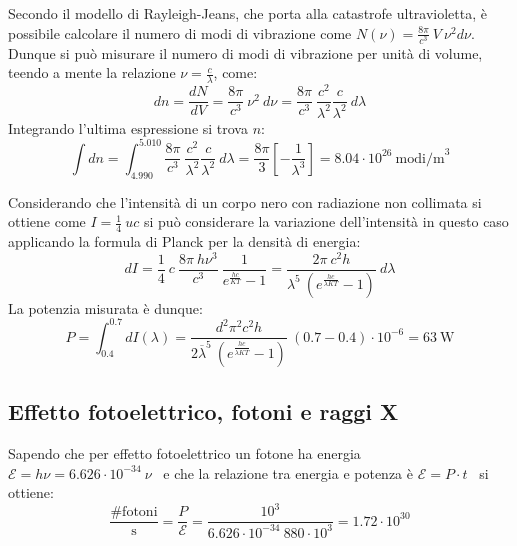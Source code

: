 \documentclass[12pt,twoside,a4]{article}
\begin{document}
\begin{solution}
	 Secondo il modello di Rayleigh-Jeans, che porta alla catastrofe ultravioletta, è possibile calcolare il numero di modi di vibrazione come $N(\nu) = \frac{8\pi}{c^3} \ V \ \nu^2 d\nu$. Dunque si può misurare il numero di modi di vibrazione per unità di volume, teendo a mente la relazione $\nu = \frac{c}{\lambda}$, come: \begin{equation*}
  dn = \frac{dN}{dV} = \frac{8\pi}{c^3} \ \nu^2 \ d\nu =  \frac{8\pi}{c^3} \ \frac{c^2}{\lambda^2} \frac{c}{\lambda^2} \ d\lambda   
 \end{equation*}
 Integrando l'ultima espressione si trova $n$: \begin{equation*}
     \int dn = \int_{4.990}^{5.010} \frac{8\pi}{c^3} \ \frac{c^2}{\lambda^2} \frac{c}{\lambda^2} \ d\lambda = \frac{8\pi}{3} \left[- \frac{1}{\lambda^3}\right] = 8.04 \cdot 10^{26} \ \mathrm{modi/m}^3 
 \end{equation*}
\end{solution}


\newpage
\begin{solution}
	 Considerando che l'intensità di un corpo nero con radiazione non collimata si ottiene come $I = \frac{1}{4} \ u c$ si può considerare la variazione dell'intensità in questo caso applicando la formula di Planck per la densità di energia: \begin{equation*}
     dI = \frac{1}{4} \ c \ \frac{8\pi \ h \nu^3}{c^3} \ \frac{1}{e^{\frac{hc}{KT}}-1} = \frac{2\pi \ c^2h}{\lambda^5 \ (e^{\frac{hc}{\lambda KT}}-1)} \ d\lambda     
 \end{equation*}
 La potenzia misurata è dunque: \begin{equation*}
     P = \int_{0.4}^{0.7} dI(\lambda) = \frac{d^2 \pi^2 c^2 h}{2 \overline{\lambda}^5 \ (e^{\frac{hc}{\overline{\lambda} KT}} -1)} \ (0.7-0.4) \cdot 10^{-6} = 63 \ \mathrm{W} 
 \end{equation*}
\end{solution}



\newpage
\subsection{Effetto fotoelettrico, fotoni e raggi X}
\begin{solution}
	Sapendo che per effetto fotoelettrico un fotone ha energia \ $\mathcal{E} = h \nu = 6.626 \cdot 10^{-34} \ \nu  $ \  e che la relazione tra energia e potenza è $\mathcal{E} = P \cdot t$ \ si ottiene: \begin{equation*}
    \frac{\mathrm{\#fotoni}}{\mathrm{s}} = \frac{P}{\mathcal{E}} = \frac{10^3}{6.626 \cdot 10^{-34} \ 880 \cdot 10^{3}} = 1.72 \cdot 10^{30} 
\end{equation*}
\end{solution}
\end{document}

